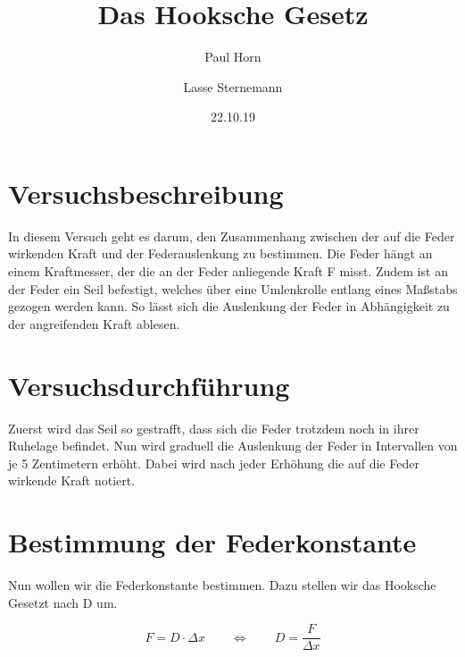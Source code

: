 \documentclass{scrartcl}
\title{Das Hooksche Gesetz}
\author{Paul Horn \and Lasse Sternemann}
\date{22.10.19}
\begin{document}
    \maketitle

    \section{Versuchsbeschreibung}
        In diesem Versuch geht es darum, den Zusammenhang zwischen der auf die Feder wirkenden Kraft und der Federauslenkung zu bestimmen.
        Die Feder hängt an einem Kraftmesser, der die an der Feder anliegende Kraft F misst. Zudem ist an der Feder ein Seil befestigt, 
        welches über eine Umlenkrolle entlang eines Maßstabs gezogen werden kann. So lässt sich die Auslenkung der Feder in Abhängigkeit zu
        der angreifenden Kraft ablesen.

    \section{Versuchsdurchführung}
        Zuerst wird das Seil so gestrafft, dass sich die Feder trotzdem noch in ihrer Ruhelage befindet. Nun wird graduell die Auslenkung der 
        Feder in Intervallen von je 5 Zentimetern erhöht. Dabei wird nach jeder Erhöhung die auf die Feder wirkende Kraft notiert.

        
    \section{Bestimmung der Federkonstante}
        Nun wollen wir die Federkonstante bestimmen. Dazu stellen wir das Hooksche Gesetzt nach D um.

    \begin{equation}
        F = D \cdot \Delta x  \qquad \Leftrightarrow  \qquad D = \frac{F}{\Delta x}
    \end{equation} 
\end{document}
